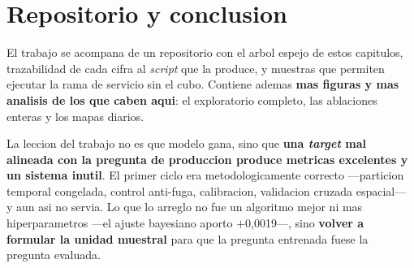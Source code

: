 \documentclass[10pt,a4paper]{article}
\begin{document}
\section{Repositorio y conclusion}

El trabajo se acompana de un repositorio con el arbol espejo de estos capitulos, trazabilidad de
cada cifra al \emph{script} que la produce, y muestras que permiten ejecutar la rama de servicio sin
el cubo. Contiene ademas \textbf{mas figuras y mas analisis de los que caben aqui}: el exploratorio
completo, las ablaciones enteras y los mapas diarios.

La leccion del trabajo no es que modelo gana, sino que \textbf{una \emph{target} mal alineada con la
pregunta de produccion produce metricas excelentes y un sistema inutil}. El primer ciclo era
metodologicamente correcto ---particion temporal congelada, control anti-fuga, calibracion,
validacion cruzada espacial--- y aun asi no servia. Lo que lo arreglo no fue un algoritmo mejor ni
mas hiperparametros ---el ajuste bayesiano aporto $+$0,0019---, sino \textbf{volver a formular la
unidad muestral} para que la pregunta entrenada fuese la pregunta evaluada.
\end{document}
